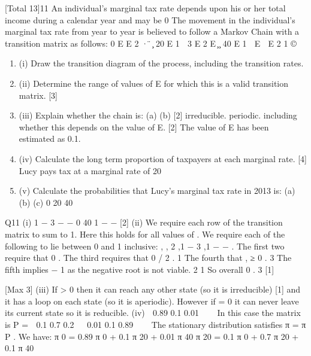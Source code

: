 \documentclass[a4paper,12pt]{article}
\begin{document}
[Total 13]11
An individual’s marginal tax rate depends upon his or her total income during a
calendar year and may be 0%
The movement in the individual’s marginal tax rate from year to year is believed to
follow a Markov Chain with a transition matrix as follows:
0%
E
E 2 ·
 ̈
 ̧
20%
E
1  3 E
2 E  ̧
 ̧
40%
E
1  E  E 2 1
©

\begin{enumerate}
    \item (i) Draw the transition diagram of the process, including the transition rates.
\item (ii) Determine the range of values of E for which this is a valid transition matrix.
[3]
\item (iii) Explain whether the chain is:
(a)
(b)
[2]
irreducible.
periodic.
including whether this depends on the value of E.
[2]
The value of E has been estimated as 0.1.
\item (iv)
Calculate the long term proportion of taxpayers at each marginal rate.
[4]
Lucy pays tax at a marginal rate of 20%
\item (v)
Calculate the probabilities that Lucy’s marginal tax rate in 2013 is:
(a)
(b)
(c)
0%
20%
40%

\end{enumerate}





Q11
(i)
1 − 3%
\beta
{}\beta
{} − \beta −
0%
40%
1 − \beta − 
[2]
(ii)
We require each row of the transition matrix to sum to 1. 
Here this holds for all values of \beta . 
We require each of the following to lie between 0 and 1 inclusive:
\beta ,  , 2 \beta ,1 − 3 \beta ,1 − \beta −  .
The first two require that 0 \leq \beta {} . 
The third requires that 0 \leq \beta {}/ 2 . 
1
The fourth that \beta \leq , \beta ≥ 0 .
3 
The fifth implies \beta {} − 1
as the negative root is not viable.
2
1
So overall 0 \leq \beta \leq .
3
[1]

[Max 3]
(iii)
If \beta > 0 then it can reach any other state (so it is irreducible) [1]
and it has a loop on each state (so it is aperiodic). 
However if \beta = 0 it can never leave its current state so it is reducible. 
(iv)
 0.89 0.1 0.01 


In this case the matrix is P =  0.1 0.7 0.2 
 0.01 0.1 0.89 

 
The stationary distribution satisfies π = π P . 
We have:
π 0 = 0.89 π 0 + 0.1 π 20 + 0.01 π 40
π 20 = 0.1 π 0 + 0.7 π 20 + 0.1 π 40
\end{document}
